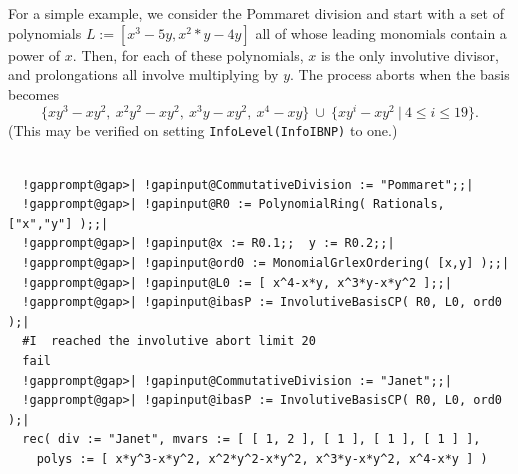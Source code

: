 \documentclass[a4paper,11pt]{report}
\begin{document}
{{{ For a simple example, we consider the Pommaret division and start with a set
of polynomials $L := [ x^3-5y, x^2*y-4y]$ all of whose leading monomials contain a power of $x$. Then, for each of these polynomials, $x$ is the only involutive divisor, and prolongations all involve multiplying by $y$. The process aborts when the basis becomes 
\[ \{ xy^3-xy^2,~ x^2y^2-xy^2,~ x^3y-xy^2,~ x^4-xy \} ~\cup~ \{ xy^i-xy^2 ~|~ 4
\leqslant i \leqslant 19 \}. \]
 (This may be verified on setting \texttt{InfoLevel(InfoIBNP)} to one.) 
\begin{Verbatim}[commandchars=!@|,fontsize=\small,frame=single,label=Example]
  
  !gapprompt@gap>| !gapinput@CommutativeDivision := "Pommaret";;|
  !gapprompt@gap>| !gapinput@R0 := PolynomialRing( Rationals, ["x","y"] );;|
  !gapprompt@gap>| !gapinput@x := R0.1;;  y := R0.2;;|
  !gapprompt@gap>| !gapinput@ord0 := MonomialGrlexOrdering( [x,y] );;|
  !gapprompt@gap>| !gapinput@L0 := [ x^4-x*y, x^3*y-x*y^2 ];;|
  !gapprompt@gap>| !gapinput@ibasP := InvolutiveBasisCP( R0, L0, ord0 );|
  #I  reached the involutive abort limit 20
  fail
  !gapprompt@gap>| !gapinput@CommutativeDivision := "Janet";;|
  !gapprompt@gap>| !gapinput@ibasP := InvolutiveBasisCP( R0, L0, ord0 );|
  rec( div := "Janet", mvars := [ [ 1, 2 ], [ 1 ], [ 1 ], [ 1 ] ], 
    polys := [ x*y^3-x*y^2, x^2*y^2-x*y^2, x^3*y-x*y^2, x^4-x*y ] )
  
\end{Verbatim}
 }

 
}}
\end{document}
